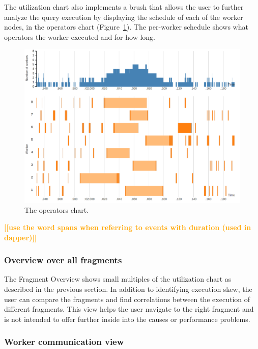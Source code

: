 \documentclass{chi2009}
\newcommand*{\overall}{Fragment Overview\xspace}
\newcommand{\todo}[1]{\textsf{\textbf{\textcolor{Orange}{[[#1]]}}}}
\begin{document}
The utilization chart also implements a brush that allows the user to further
analyze the query execution by displaying the schedule of each of the worker
nodes, in the operators chart (Figure~\ref{fig:operators_chart}). The per-worker
schedule shows what operators the worker executed and for how long.


\begin{figure}[ht]
  \includegraphics[width=\columnwidth]{images/operators_chart}
  \caption{The operators chart.}
  \label{fig:operators_chart}
\end{figure}

\todo{use the word spans when referring to events with duration (used in dapper)}

\subsubsection{Overview over all fragments}
\label{sec:fragments}


The \overall shows small multiples of the utilization chart as described in the previous section.
In addition to identifying execution skew, the user can compare the fragments and find
correlations between the execution of different fragments. This view helps the user navigate to the
right fragment and is not intended to offer further inside into the causes or performance problems.


\subsubsection{Worker communication view}
\end{document}

